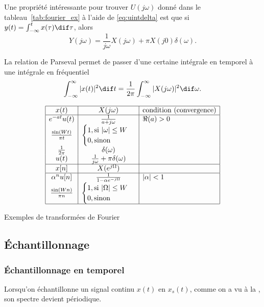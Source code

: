 Une propriété intéressante pour trouver $U(j\omega)$ donné dans le
tableau~\ref{tab:fourier_ex} à l'aide de \eqref{eq:uintdelta} est que si
$y(t) = \int_{-\infty}^t x(\tau) \dif \tau$, alors
\[ Y(j\omega) = \frac{1}{j\omega}X(j\omega) + \pi X(j0)\delta(\omega). \]

La relation de Parseval permet de passer d'une certaine intégrale en temporel
à une intégrale en fréquentiel
\[ \int_{-\infty}^\infty |x(t)|^2 \dif t
= \frac{1}{2\pi} \int_{-\infty}^\infty |X(j\omega)|^2 \dif \omega. \]

\begin{table}
  \[
    \begin{array}{|c|c|l|}
      \hline
      x(t) & X(j\omega) & \text{condition (convergence)}\\
      \hline
      e^{-at}u(t) & \frac{1}{a + j\omega} & \Re(a) > 0\\
      \frac{\sin(Wt)}{\pi t} &
      \begin{cases}
        1, \text{si } |\omega| \leq W\\
        0, \text{sinon}
      \end{cases}
      &\\
      \frac{1}{2\pi} & \delta(\omega) &\\
      u(t) & \frac{1}{j\omega} + \pi \delta(\omega)&\\
      \hline
      x[n] & X(e^{j\Omega}) &\\
      \hline
      \alpha^n u[n] & \frac{1}{1-\alpha e^{-j\Omega}} & |\alpha| < 1\\
      \frac{\sin(Wn)}{\pi n} &
      \begin{cases}
        1, \text{si } |\Omega| \leq W\\
        0, \text{sinon}
      \end{cases}
      &\\
      \hline
    \end{array}
  \]
  \caption{Exemples de transformées de Fourier}
  \label{tab:fourier_ex}
\end{table}

\subsection{Échantillonnage}
\label{sec:sampling}
\subsubsection{Échantillonnage en temporel}
Lorsqu'on échantillonne un signal continu $x(t)$ en $x_s(t)$,
comme on a vu à la ,
son spectre devient périodique.


